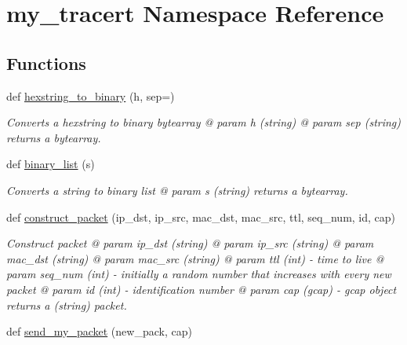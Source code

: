 \hypertarget{namespacemy__tracert}{}\section{my\+\_\+tracert Namespace Reference}
\label{namespacemy__tracert}
\subsection*{Functions}
\begin{DoxyCompactItemize}
\item 
\mbox{\label{namespacemy__tracert_af5359e0ead8f71c5e0a654cee22a7156}} 
def \hyperlink{namespacemy__tracert_af5359e0ead8f71c5e0a654cee22a7156}{hexstring\+\_\+to\+\_\+binary} (h, sep=\textquotesingle{}\textquotesingle{})
\begin{DoxyCompactList}\small\item\em Converts a hexstring to binary bytearray @ param h (string) @ param sep (string) returns a bytearray. \end{DoxyCompactList}\item 
\mbox{\label{namespacemy__tracert_ae9c9f606bde976cf010d3fb3a47ef08c}} 
def \hyperlink{namespacemy__tracert_ae9c9f606bde976cf010d3fb3a47ef08c}{binary\+\_\+list} (s)
\begin{DoxyCompactList}\small\item\em Converts a string to binary list @ param s (string) returns a bytearray. \end{DoxyCompactList}\item 
def \hyperlink{namespacemy__tracert_a55eea7ee1da325e6d2783a270a971eea}{construct\+\_\+packet} (ip\+\_\+dst, ip\+\_\+src, mac\+\_\+dst, mac\+\_\+src, ttl, seq\+\_\+num, id, cap)
\begin{DoxyCompactList}\small\item\em Construct packet @ param ip\+\_\+dst (string) @ param ip\+\_\+src (string) @ param mac\+\_\+dst (string) @ param mac\+\_\+src (string) @ param ttl (int) -\/ time to live @ param seq\+\_\+num (int) -\/ initially a random number that increases with every new packet @ param id (int) -\/ identification number @ param cap (gcap) -\/ gcap object returns a (string) packet. \end{DoxyCompactList}\item 
def \hyperlink{namespacemy__tracert_aee43e0ddf2646c6a5c18a70c8ebd03a4}{send\+\_\+my\+\_\+packet} (new\+\_\+pack, cap)

\end{DoxyCompactItemize}
